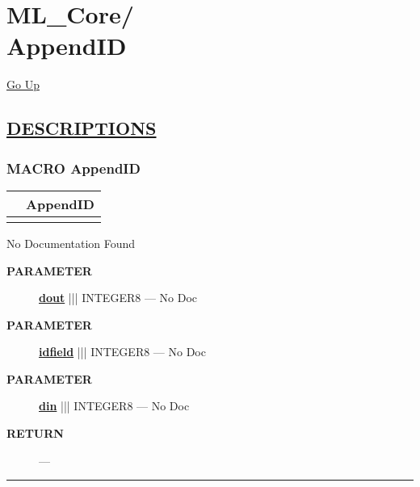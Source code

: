 \chapter*{\color{headfile}
{\large ML\_Core\slash\hspace{0pt}}
 \\
AppendID
}
\hypertarget{ecldoc:toc:ML_Core.AppendID}{}
\hyperlink{ecldoc:toc:root/ML_Core}{Go Up}


\section*{\underline{\textsf{DESCRIPTIONS}}}
\subsection*{\textsf{\colorbox{headtoc}{\color{white} MACRO}
AppendID}}

\hypertarget{ecldoc:ml_core.appendid}{}

{\renewcommand{\arraystretch}{1.5}
\begin{tabularx}{\textwidth}{|>{\raggedright\arraybackslash}l|X|}
\hline
\hspace{0pt}\mytexttt{\color{red} } & \textbf{AppendID} \\
\hline
\multicolumn{2}{|>{\raggedright\arraybackslash}X|}{\hspace{0pt}\mytexttt{\color{param} (dIn,idfield,dOut)}} \\
\hline
\end{tabularx}
}

\par





No Documentation Found






\par
\begin{description}
\item [\colorbox{tagtype}{\color{white} \textbf{\textsf{PARAMETER}}}] \textbf{\underline{dout}} ||| INTEGER8 --- No Doc
\item [\colorbox{tagtype}{\color{white} \textbf{\textsf{PARAMETER}}}] \textbf{\underline{idfield}} ||| INTEGER8 --- No Doc
\item [\colorbox{tagtype}{\color{white} \textbf{\textsf{PARAMETER}}}] \textbf{\underline{din}} ||| INTEGER8 --- No Doc
\end{description}







\par
\begin{description}
\item [\colorbox{tagtype}{\color{white} \textbf{\textsf{RETURN}}}] \textbf{} --- 
\end{description}




\rule{\linewidth}{0.5pt}
